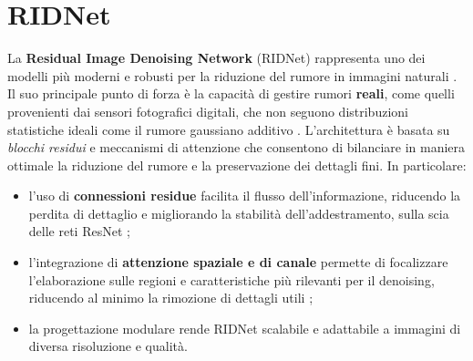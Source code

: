\documentclass[12pt,a4paper,openright,twoside]{book}
\begin{document}
\section{RIDNet}
La \textbf{Residual Image Denoising Network} (RIDNet) rappresenta uno dei modelli più moderni e robusti per la riduzione del rumore in immagini naturali \parencite{Abdelhamed_2019_CVPR_Workshops}.  \\
Il suo principale punto di forza è la capacità di gestire rumori \textbf{reali}, come quelli provenienti dai sensori fotografici digitali, che non seguono distribuzioni statistiche ideali come il rumore gaussiano additivo \parencite{janesick2007,foi2008,makitalo2013}. \whiteline
L'architettura è basata su \textit{blocchi residui} e meccanismi di attenzione che consentono di bilanciare in maniera ottimale la riduzione del rumore e la preservazione dei dettagli fini.  
In particolare:
\begin{itemize}
    \item l'uso di \textbf{connessioni residue} facilita il flusso dell'informazione, riducendo la perdita di dettaglio e migliorando la stabilità dell'addestramento, sulla scia delle reti ResNet \parencite{he2016deep};
    \item l'integrazione di \textbf{attenzione spaziale e di canale} permette di focalizzare l'elaborazione sulle regioni e caratteristiche più rilevanti per il denoising, riducendo al minimo la rimozione di dettagli utili \parencite{hu2018squeeze};
    \item la progettazione modulare rende RIDNet scalabile e adattabile a immagini di diversa risoluzione e qualità.
\end{itemize}
\end{document}
